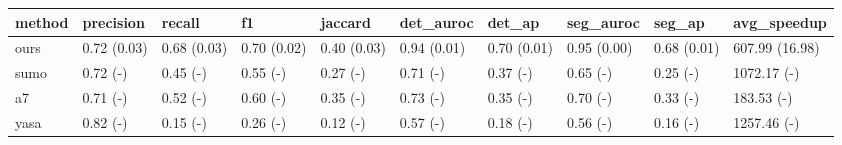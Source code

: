 \begin{tabular}{llllllllll}
\toprule
method & precision & recall & f1 & jaccard & det_auroc & det_ap & seg_auroc & seg_ap & avg_speedup \\
\midrule
ours & 0.72 (0.03) & 0.68 (0.03) & 0.70 (0.02) & 0.40 (0.03) & 0.94 (0.01) & 0.70 (0.01) & 0.95 (0.00) & 0.68 (0.01) & 607.99 (16.98) \\
sumo & 0.72 (-) & 0.45 (-) & 0.55 (-) & 0.27 (-) & 0.71 (-) & 0.37 (-) & 0.65 (-) & 0.25 (-) & 1072.17 (-) \\
a7 & 0.71 (-) & 0.52 (-) & 0.60 (-) & 0.35 (-) & 0.73 (-) & 0.35 (-) & 0.70 (-) & 0.33 (-) & 183.53 (-) \\
yasa & 0.82 (-) & 0.15 (-) & 0.26 (-) & 0.12 (-) & 0.57 (-) & 0.18 (-) & 0.56 (-) & 0.16 (-) & 1257.46 (-) \\
\bottomrule
\end{tabular}
